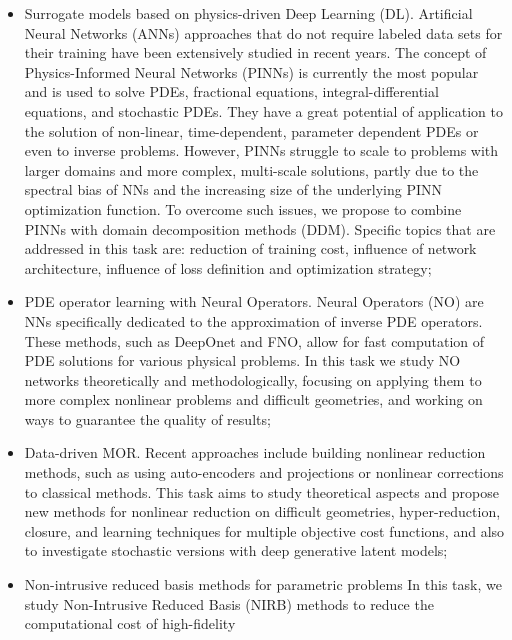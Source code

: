 \begin{itemize}
\item[T2.1]  Surrogate models  based on  physics-driven Deep  Learning
  (DL).   Artificial Neural  Networks  (ANNs) approaches  that do  not
  require labeled data  sets for their training  have been extensively
  studied  in recent  years.  The  concept of  Physics-Informed Neural
  Networks (PINNs) is currently the most  popular and is used to solve
  PDEs,  fractional  equations, integral-differential  equations,  and
  stochastic PDEs. They  have a great potential of  application to the
  solution of non-linear, time-dependent,  parameter dependent PDEs or
  even  to inverse  problems.   However, PINNs  struggle  to scale  to
  problems  with   larger  domains   and  more   complex,  multi-scale
  solutions, partly due to the spectral bias of NNs and the increasing
  size of the underlying PINN optimization function. To overcome such
  issues, we propose to combine PINNs with domain decomposition methods
  (DDM).   Specific  topics  that  are addressed  in  this  task  are:
  reduction  of  training  cost, influence  of  network  architecture,
  influence of loss definition and optimization strategy;
\item[T2.2]  PDE  operator  learning with  Neural  Operators.   Neural
  Operators (NO)  are NNs specifically dedicated  to the approximation
  of inverse PDE operators.  These  methods, such as DeepOnet and FNO,
  allow for  fast computation  of PDE  solutions for  various physical
  problems.  In  this task  we  study  NO networks  theoretically  and
  methodologically,  focusing   on  applying  them  to   more  complex
  nonlinear problems and difficult geometries,  and working on ways to
  guarantee the quality of results;
\item  [T2.3]  Data-driven  MOR. Recent  approaches  include  building
  nonlinear  reduction  methods,  such   as  using  auto-encoders  and
  projections or nonlinear corrections to classical methods. This task
  aims  to  study theoretical  aspects  and  propose new  methods  for
  nonlinear  reduction   on  difficult   geometries,  hyper-reduction,
  closure,  and  learning  techniques   for  multiple  objective  cost
  functions,  and also  to investigate  stochastic versions  with deep
  generative latent models;
\item[T2.4]  Non-intrusive   reduced  basis  methods   for  parametric
  problems In this  task, we study Non-Intrusive  Reduced Basis (NIRB)
  methods   to  reduce   the  computational   cost  of   high-fidelity

\end{itemize}
